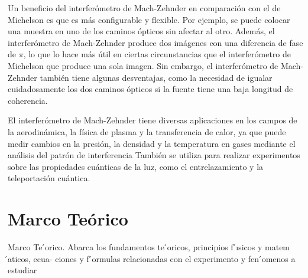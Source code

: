 Un beneficio del interferómetro de Mach-Zehnder en comparación con el de Michelson es que es más configurable y flexible. Por ejemplo, se puede colocar una muestra en uno de los caminos ópticos sin afectar al otro. Además, el interferómetro de Mach-Zehnder produce dos imágenes con una diferencia de fase de $\pi$, lo que lo hace más útil en ciertas circunstancias que el interferómetro de Michelson que produce una sola imagen. Sin embargo, el interferómetro de Mach-Zehnder también tiene algunas desventajas, como la necesidad de igualar cuidadosamente los dos caminos ópticos si la fuente tiene una baja longitud de coherencia.

El interferómetro de Mach-Zehnder tiene diversas aplicaciones en los campos de la aerodinámica, la física de plasma y la transferencia de calor, ya que puede medir cambios en la presión, la densidad y la temperatura en gases mediante el análisis del patrón de interferencia\cite{wikiwand} \cite{problemasresueltos} También se utiliza para realizar experimentos sobre las propiedades cuánticas de la luz, como el entrelazamiento y la teleportación cuántica.


\section{Marco Teórico}

Marco Te ́orico. Abarca los fundamentos te ́oricos, principios f ́ısicos y matem ́aticos, ecua-
ciones y f ́ormulas relacionadas con el experimento y fen ́omenos a estudiar







